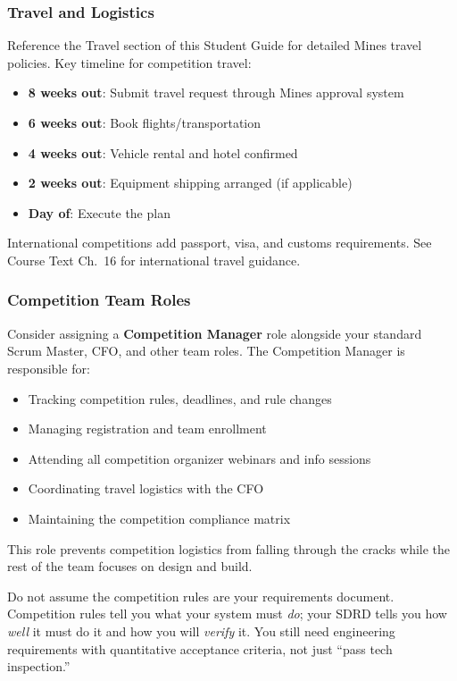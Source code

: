 \subsubsection{Travel and Logistics}

\begin{tipbox}
Reference the Travel section of this Student Guide for detailed Mines travel policies. Key timeline for competition travel:
\begin{itemize}[nosep,leftmargin=1.5em]
\item \textbf{8 weeks out}: Submit travel request through Mines approval system
\item \textbf{6 weeks out}: Book flights/transportation
\item \textbf{4 weeks out}: Vehicle rental and hotel confirmed
\item \textbf{2 weeks out}: Equipment shipping arranged (if applicable)
\item \textbf{Day of}: Execute the plan
\end{itemize}
International competitions add passport, visa, and customs requirements. See Course Text Ch.~16 for international travel guidance.
\end{tipbox}

\subsubsection{Competition Team Roles}

\begin{protip}
Consider assigning a \textbf{Competition Manager} role alongside your standard Scrum Master, CFO, and other team roles. The Competition Manager is responsible for:
\begin{itemize}[nosep,leftmargin=1.5em]
\item Tracking competition rules, deadlines, and rule changes
\item Managing registration and team enrollment
\item Attending all competition organizer webinars and info sessions
\item Coordinating travel logistics with the CFO
\item Maintaining the competition compliance matrix
\end{itemize}
This role prevents competition logistics from falling through the cracks while the rest of the team focuses on design and build.
\end{protip}

\begin{warnbox}
Do not assume the competition rules are your requirements document. Competition rules tell you what your system must \emph{do}; your SDRD tells you how \emph{well} it must do it and how you will \emph{verify} it. You still need engineering requirements with quantitative acceptance criteria, not just ``pass tech inspection.''
\end{warnbox}


